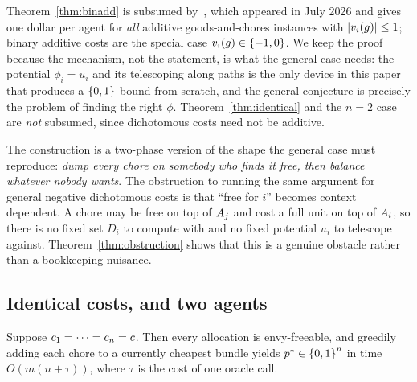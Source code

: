 \begin{remark}
\label{rem:binadd-superseded}
Theorem~\ref{thm:binadd} is subsumed by~\cite{LMS26}, which appeared in July
2026 and gives one dollar per agent for \emph{all} additive goods-and-chores
instances with $\left\lvert v_i(g)\right\rvert \le 1$; binary additive costs are the special case
$v_i(g) \in \left\{-1,0\right\}$. We keep the proof because the mechanism, not the
statement, is what the general case needs: the potential $\phi_i = u_i$ and its
telescoping along paths is the only device in this paper that produces a
$\left\{0,1\right\}$ bound from scratch, and the general conjecture is precisely the
problem of finding the right $\phi$. Theorem~\ref{thm:identical} and the $n = 2$
case are \emph{not} subsumed, since dichotomous costs need not be additive.
\end{remark}

The construction is a two-phase version of the shape the general case must
reproduce: \emph{dump every chore on somebody who finds it free, then balance
whatever nobody wants}. The obstruction to running the same argument for general
negative dichotomous costs is that ``free for $i$'' becomes context dependent. A
chore may be free on top of $A_{j}$ and cost a full unit on top of
$A_{i}$, so there is no fixed set $D_i$ to compute with and no fixed
potential $u_i$ to telescope against. Theorem~\ref{thm:obstruction} shows that
this is a genuine obstacle rather than a bookkeeping nuisance.

\subsection{Identical costs, and two agents}
\label{sec:identical}

\begin{theorem}
\label{thm:identical}
Suppose $c_1 = \dots = c_n = c$. Then every allocation is
envy-freeable, and greedily adding each chore to a currently cheapest bundle
yields $p^{*} \in \left\{0,1\right\}^n$ in time $O(m(n + \tau))$, where $\tau$ is
the cost of one oracle call.
\end{theorem}

